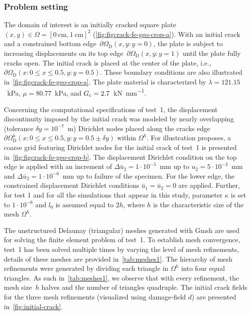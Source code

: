 \subsubsection{Problem setting \label{sec:2D-problem-statement}}
%
The domain of interest is an initially cracked square plate $(x,y) \in \Omega =[0~\si{\centi\meter},1~\si{\centi\meter}]^2$ (\cref{fig:figcrack-fe-geo-crop-a}). With an initial crack and a constrained bottom edge~$\partial\Omega_{\text{D}}(x,y:y=0)$, the plate  is subject to increasing displacements on its top edge~$\partial\Omega_{\text{D}}(x,y:y=1)$ until the plate fully cracks open.
The initial crack is placed at the center of the plate, i.e., $\partial\Omega_{\text{D}}(x:0 \le x \le 0.5,y:y=0.5)$. These boundary conditions are also illustrated in~\cref{fig:figcrack-fe-geo-crop-a}.
The plate material is characterized by $\lambda=121.15$~\si{\kilo\pascal}, $\mu=80.77$~\si{\kilo\pascal}, and $G_{\text{c}}=2.7$~\si{\kilo\newton\per\milli\meter}.

Concerning  the  computational specifications of test~1,  the displacement discontinuity  imposed by the initial crack was modeled by nearly overlapping (tolerance $\delta y=10^{-7}$~\si{\meter}) Dirichlet nodes  placed along the cracks edge $\partial\Omega^h_{\text{D}}(x:0 \le x \le 0.5,y:y=0.5\pm\delta y)$ within $\Omega^h$. For illustration proposes,  a coarse grid featuring Dirichlet nodes for the initial crack of test~1 is presented in~\cref{fig:figcrack-fe-geo-crop-b}.
The displacement Dirichlet condition on the top edge is applied with an increment of $\Delta\bar{u}_{2} =1\cdot10^{-5}$~\si{\milli\meter} up to $u_2=5\cdot10^{-3}$~\si{\milli\meter} and $\Delta\bar{u}_{2} =1\cdot10^{-6}$~\si{\milli\meter} up to failure of the specimen. For the lower edge, the constrained displacement Dirichlet conditions $\bar{u}_{1}=\bar{u}_{2}=0$ are applied. Further, for test 1 and for all the simulations that appear in this study, parameter $\kappa$ is set to $1\cdot10^{-6}$ and $l_0$ is assumed equal to $2h$, where $h$ is the characteristic size of the mesh $\Omega^h$.  

The unstructured Delaunay (triangular) meshes generated with Gmsh are used for solving the finite element problem of test~1. To establish mesh convergence, test~1 has been solved multiple times by varying the level of mesh refinements, details of these meshes are provided in~\cref{tab:meshes1}. The hierarchy of mesh refinements were generated by dividing each triangle in $\Omega^h$ into four equal triangles. As such in~\cref{tab:meshes1}, we observe that with every refinement, the mesh size~$h$ halves and the number of triangles quadruple. The initial crack fields for the three mesh refinements (visualized using damage-field $d$) are presented in~\cref{fig:initial-crack}.    %

